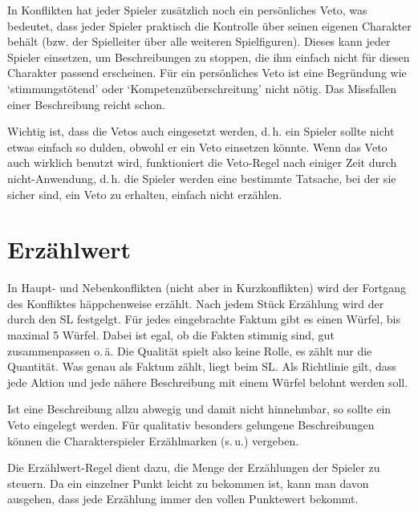 In Konflikten hat jeder Spieler zusätzlich noch ein persönliches Veto, was bedeutet, dass jeder Spieler praktisch die Kontrolle über seinen eigenen Charakter behält (bzw. der Spielleiter über alle weiteren Spielfiguren). Dieses kann jeder Spieler einsetzen, um Beschreibungen zu stoppen, die ihm einfach nicht für diesen Charakter passend erscheinen. Für ein persönliches Veto ist eine Begründung wie `stimmungstötend' oder `Kompetenzüberschreitung' nicht nötig. Das Missfallen einer Beschreibung reicht schon.

Wichtig ist, dass die Vetos auch eingesetzt werden, d.\,h. ein Spieler sollte nicht etwas einfach so dulden, obwohl er ein Veto einsetzen könnte. Wenn das Veto auch wirklich benutzt wird, funktioniert die Veto-Regel nach einiger Zeit durch nicht-Anwendung, d.\,h. die Spieler werden eine bestimmte Tatsache, bei der sie sicher sind, ein Veto zu erhalten, einfach nicht erzählen.

\section{Erzählwert}
In Haupt- und Nebenkonflikten (nicht aber in Kurzkonflikten) wird der Fortgang des Konfliktes häppchenweise erzählt. Nach jedem Stück Erzählung wird der  durch den SL festgelgt. Für jedes eingebrachte Faktum gibt es einen Würfel, bis maximal 5 Würfel. Dabei ist egal, ob die Fakten stimmig sind, gut zusammenpassen o.\,ä. Die Qualität spielt also keine Rolle, es zählt nur die Quantität. Was genau als Faktum zählt, liegt beim SL. Als Richtlinie gilt, dass jede Aktion und jede nähere Beschreibung mit einem Würfel belohnt werden soll.

Ist eine Beschreibung allzu abwegig und damit nicht hinnehmbar, so sollte ein Veto eingelegt werden. Für qualitativ besonders gelungene Beschreibungen können die Charakterspieler Erzählmarken (s.\,u.) vergeben.

Die Erzählwert-Regel dient dazu, die Menge der Erzählungen der Spieler zu steuern. Da ein einzelner Punkt leicht zu bekommen ist, kann man davon ausgehen, dass jede Erzählung immer den vollen Punktewert bekommt.

